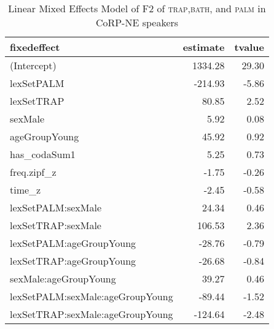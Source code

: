 \begin{table}[ht]
\centering
\begin{tabular}{lrr}
  \hline
fixedeffect & estimate & tvalue \\ 
  \hline
(Intercept) & 1334.28 & 29.30 \\ 
  lexSetPALM & -214.93 & -5.86 \\ 
  lexSetTRAP & 80.85 & 2.52 \\ 
  sexMale & 5.92 & 0.08 \\ 
  ageGroupYoung & 45.92 & 0.92 \\ 
  has\_codaSum1 & 5.25 & 0.73 \\ 
  freq.zipf\_z & -1.75 & -0.26 \\ 
  time\_z & -2.45 & -0.58 \\ 
  lexSetPALM:sexMale & 24.34 & 0.46 \\ 
  lexSetTRAP:sexMale & 106.53 & 2.36 \\ 
  lexSetPALM:ageGroupYoung & -28.76 & -0.79 \\ 
  lexSetTRAP:ageGroupYoung & -26.68 & -0.84 \\ 
  sexMale:ageGroupYoung & 39.27 & 0.46 \\ 
  lexSetPALM:sexMale:ageGroupYoung & -89.44 & -1.52 \\ 
  lexSetTRAP:sexMale:ageGroupYoung & -124.64 & -2.48 \\ 
   \hline
\end{tabular}
\caption{Linear Mixed Effects Model of F2 of \textsc{trap},\textsc{bath}, and \textsc{palm} in CoRP-NE speakers \label{tbl:TBPF2NE}} 
\end{table}
